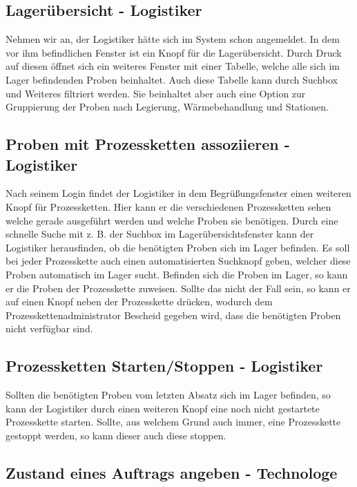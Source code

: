\documentclass[enabledeprecatedfontcommands,fontsize=12pt,paper=a4,twoside]{scrartcl}
\begin{document}
\subsection{Lagerübersicht - Logistiker}

Nehmen wir an, der Logistiker hätte sich im System schon angemeldet.
In dem vor ihm befindlichen Fenster ist ein Knopf für die Lagerübersicht. Durch Druck auf diesen öffnet sich ein weiteres Fenster mit einer Tabelle, welche alle sich im Lager befindenden Proben beinhaltet. Auch diese Tabelle kann durch Suchbox und Weiteres filtriert werden. Sie beinhaltet aber auch eine Option zur Gruppierung der Proben nach Legierung, Wärmebehandlung und Stationen.

\subsection{Proben mit Prozessketten assoziieren - Logistiker}

Nach seinem Login findet der Logistiker in dem Begrüßungsfenster einen weiteren Knopf für Prozessketten. Hier kann er die verschiedenen Prozessketten sehen welche gerade ausgeführt werden und welche Proben sie benötigen. Durch eine schnelle Suche mit z. B. der Suchbox im Lagerübersichtsfenster kann der Logistiker herausfinden, ob die benötigten Proben sich im Lager befinden. Es soll bei jeder Prozesskette auch einen automatisierten Suchknopf geben, welcher diese Proben automatisch im Lager sucht.
Befinden sich die Proben im Lager, so kann er die Proben der Prozesskette zuweisen. Sollte das nicht der Fall sein, so kann er auf einen Knopf neben der Prozesskette drücken, wodurch dem Prozesskettenadministrator Bescheid gegeben wird, dass die benötigten Proben nicht verfügbar sind.
 
\subsection{Prozessketten Starten/Stoppen - Logistiker}

Sollten die benötigten Proben vom letzten Absatz sich im Lager befinden, so kann der Logistiker durch einen weiteren Knopf eine noch nicht gestartete Prozesskette starten.
Sollte, aus welchem Grund auch immer, eine Prozesskette gestoppt werden, so kann dieser auch diese stoppen.

\subsection{Zustand eines Auftrags angeben - Technologe}
\end{document}
